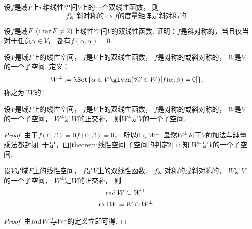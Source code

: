 \begin{proposition}
设\(f\)是域\(F\)上\(n\)维线性空间\(V\)上的一个双线性函数，
则\begin{equation*}
	\text{$f$是斜对称的}
	\iff
	\text{$f$的度量矩阵是斜对称的}.
\end{equation*}
\end{proposition}

\begin{example}
设\(f\)是域\(F\ (\operatorname{char} F\neq2)\)上线性空间\(V\)的双线性函数.
证明：\(f\)是斜对称的，当且仅当
对于任意\(\alpha \in V\)，
都有\(f(\alpha,\alpha) = 0\).
\end{example}

\begin{definition}\label{definition:双线性函数.利用双线性函数构造的正交补}
设\(V\)是域\(F\)上的线性空间，
\(f\)是\(V\)上的双线性函数，
\(f\)是对称的或斜对称的，
\(W\)是\(V\)的一个子空间.
定义：\begin{equation*}
	W^\perp
	\defeq
	\Set{
		\alpha \in V
		\given
		(\forall \beta \in W)
		[f(\alpha,\beta) = 0]
	},
\end{equation*}
称之为“\(W\)的”.
\end{definition}

\begin{proposition}
设\(V\)是域\(F\)上的线性空间，
\(f\)是\(V\)上的双线性函数，
\(f\)是对称的或斜对称的，
\(W\)是\(V\)的一个子空间，
\(W^\perp\)是\(W\)的正交补，
则\(W^\perp\)是\(V\)的一个子空间.
\begin{proof}
由于\(f(0,\beta) = 0 f(0,\beta) = 0\)，
所以\(0 \in W^\perp\).
显然\(W^\perp\)对于\(V\)的加法与纯量乘法都封闭.
于是，由\cref{theorem:线性空间.子空间的判定2} 可知
\(W^\perp\)是\(V\)的一个子空间.
\end{proof}
\end{proposition}

\begin{proposition}
设\(V\)是域\(F\)上的线性空间，
\(f\)是\(V\)上的双线性函数，
\(f\)是对称的或斜对称的，
\(W\)是\(V\)的一个子空间，
\(W^\perp\)是\(W\)的正交补，
则\begin{gather*}
	\operatorname{rad} W \subseteq W^\perp, \\
	\operatorname{rad} W = W \cap W^\perp.
\end{gather*}
\begin{proof}
由\(\operatorname{rad} W\)与\(W^\perp\)的定义立即可得.
\end{proof}
\end{proposition}

